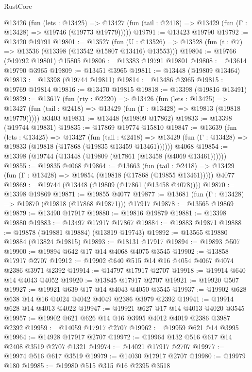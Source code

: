 \begin{lexlean}{RustCore}
\begin{coremodule}
    @13426
      (fun (lets : @13425) =>
      @13427 (fun (tail : @2418) => @13429 (fun (Γ : @13428) => @19746 (@19773 @19779)))))
@19791 := @13423 @19790
@19792 := @13420 @19791
@19801 := @13527
    (fun (U : @13526) => @13528 (fun (t : @7) => @13536 (@13398 (@13542 @15807 @13416) @13553)))
@19804 := @19766 (@19792 @19801) @15805
@19806 := @13383 @19791 @19801
@19808 := @13614 @19790 @3965
@19809 := @13451 @3965
@19811 := @13448 (@19809 @13464)
@19813 := @13398 (@19744 @19811)
@19814 := @13486 @3965
@19815 := @19769 @19814
@19816 := @13470 @19815
@19818 := @13398 (@19816 @13491)
@19829 := @13617
    (fun (rty : @2220) =>
    @13426
      (fun (lets : @13425) =>
      @13427 (fun (tail : @2418) => @13429 (fun (Γ : @13428) => @19813 (@19818 @19779)))))
    @3403
@19831 := @13448 (@19809 @17862)
@19833 := @13398 (@19744 @19831)
@19835 := @17869 @19774 @15810
@19847 := @13639
    (fun (lets : @13425) =>
    @13427
      (fun (tail : @2418) =>
      @13429 (fun (Γ : @13428) => @19833 (@19818 (@17868 (@19835 @13459 @13461))))))
    @4068
@19854 := @13398 (@19744 (@13448 (@19809 (@17861 (@13458 (@4069 @13461))))))
@19855 := @19835 @4068
@19864 := @13663
    (fun (tail : @2418) => @13429 (fun (Γ : @13428) => @19854 (@19818 (@17868 (@19855 @13461)))))
    @4077
@19869 := @19744 (@13448 (@19809 (@17861 (@13458 @4078))))
@19870 := @13398 @19869
@19871 := @19855 @4077
@19877 := @13681 (fun (Γ : @13428) => @19870 (@19818 (@17868 @19871))) @17917
@19878 := @13565 @19869
@19879 := @13490 @17917
@19880 := @19816 @19879
@19881 := @13398 @19880
@19883 := @13497 @17917 @17867
@19884 := @19883 @19871
@19888 := @19878 (@19881 @19884) (@13819 @19743)
@19892 := @13565 @19880 @19884 (@13824 @19815)
@19893 := @18131 @17917
@19894 := @19893 @507
@19900 := @19894 @642 @17 @14 @4068 @4075 @3545
@19902 := @13858 @17917 @2707
@19912 := @19902 @640 @515 @14 @16 @4054 @4067 @4074 @2386 @3971 @2392
@19914 := @14797 @17917 @2707
@19918 := @19914 @640 @14 @4043 @4052
@19920 := @13845 @17917 @2707
@19921 := @19920 @507
@19927 := @19921 @639 @17 @14 @4043 @4050 @3545
@19937 := @19902 @628 @638 @14 @16 @4024 @4042 @4049 @2386 @3979 @2392
@19941 := @19914 @628 @14 @4013 @4022
@19947 := @19921 @627 @17 @14 @4013 @4020 @3545
@19957 := @19902 @621 @626 @14 @16 @3995 @4012 @4019 @2386 @3987 @2392
@19959 := @14059 @17917 @2707
@19962 := @19959 @621 @14 @3995
@19964 := @14928 @17917 @2707
@19972 := @19964 @132 @516 @617 @14 @2408 @3519 @2707 @1321
@19974 := @14021 @17917 @2707
@19977 := @19974 @516 @617 @3519
@19979 := @14030 @17917 @2707
@19980 := @19979 @180
@19985 := @19980 @515 @315 @16 @2395 @3518

\end{coremodule}
\end{lexlean}
